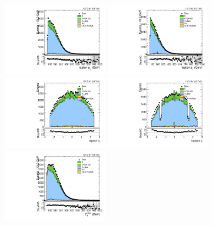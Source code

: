 \begin{figure}[htbp]
  \centering
  \includegraphics[width=0.4\textwidth]{fig/analysis/SB_b1_mu_allP_allC_allE_Run2_lnujj_l1_l_pt.pdf}
  \includegraphics[width=0.4\textwidth]{fig/analysis/SB_b1_e_allP_allC_allE_Run2_lnujj_l1_l_pt.pdf}\\
  \includegraphics[width=0.4\textwidth]{fig/analysis/SB_b1_mu_allP_allC_allE_Run2_lnujj_l1_l_eta.pdf}
  \includegraphics[width=0.4\textwidth]{fig/analysis/SB_b1_e_allP_allC_allE_Run2_lnujj_l1_l_eta.pdf}\\
  \includegraphics[width=0.4\textwidth]{fig/analysis/SB_b1_mu_allP_allC_allE_Run2_met_pt.pdf}

\end{figure}
